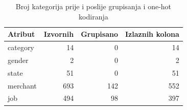 \begin{table}[H]\centering\small
\caption{Broj kategorija prije i poslije grupisanja i one-hot kodiranja}
\begin{tabularx}{\linewidth}{@{}Yrrr@{}}\toprule
Atribut & Izvornih & Grupisano & Izlaznih kolona \\ \midrule
category & 14 & 0 & 14 \\
gender & 2 & 0 & 2 \\
state & 51 & 0 & 51 \\
merchant & 693 & 142 & 552 \\
job & 494 & 98 & 397 \\
\bottomrule\end{tabularx}\end{table}
